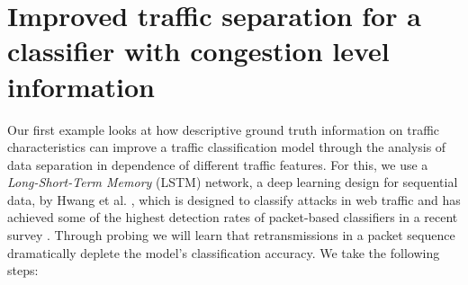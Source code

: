 \documentclass[10pt,conference]{IEEEtran}
\begin{document}
\section{Improved traffic separation for a classifier with congestion level information}\label{Sec:Improvedtrafficsep}


Our first example looks at how descriptive ground truth information on traffic characteristics can improve a traffic classification model through the analysis of data separation in dependence of different traffic features. For this, we use a \textit{Long-Short-Term Memory} (LSTM) network, a deep learning design for sequential data, by Hwang et al. \cite{hwang2019lstm}, which is designed to classify attacks in web traffic and has achieved some of the highest detection rates of packet-based classifiers in a recent survey \cite{tahaei2020rise}. Through probing we will learn that retransmissions in a packet sequence dramatically deplete the model's classification accuracy. We take the following steps:


\end{document}
